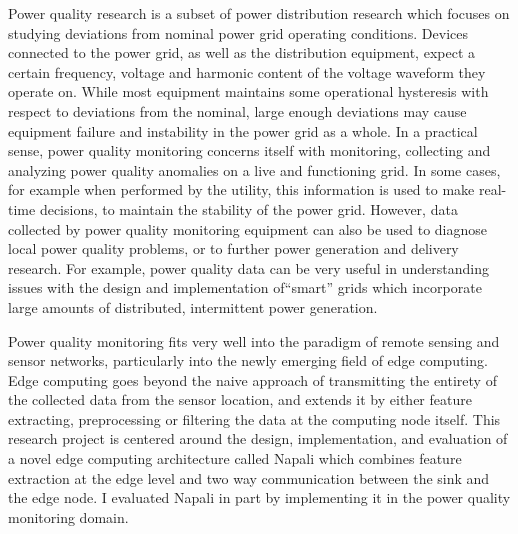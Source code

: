 Power quality research is a subset of power distribution research which focuses on studying deviations from nominal power grid operating conditions.
Devices connected to the power grid, as well as the distribution equipment, expect a certain frequency, voltage and harmonic content of the voltage waveform they operate on.
While most equipment maintains some operational hysteresis with respect to deviations from the nominal, large enough deviations may cause equipment failure and instability in the power grid as a whole.
In a practical sense, power quality monitoring concerns itself with monitoring, collecting and analyzing power quality anomalies on a live and functioning grid.
In some cases, for example when performed by the utility, this information is used to make real-time decisions, to maintain the stability of the power grid.
However, data collected by power quality monitoring equipment can also be used to diagnose local power quality problems, or to further power generation and delivery research.
For example, power quality data can be very useful in understanding issues with the design and implementation of``smart'' grids which incorporate large amounts of distributed, intermittent power generation.

Power quality monitoring fits very well into the paradigm of remote sensing and sensor networks, particularly into the newly emerging field of edge computing.
Edge computing goes beyond the naive approach of transmitting the entirety of the collected data from the sensor location, and extends it by either feature extracting, preprocessing or filtering the data at the computing node itself.
This research project is centered around the design, implementation, and evaluation of a novel edge computing architecture called Napali which combines feature extraction at the edge level and two way communication between the sink and the edge node.
I evaluated Napali in part by implementing it in the power quality monitoring domain.

